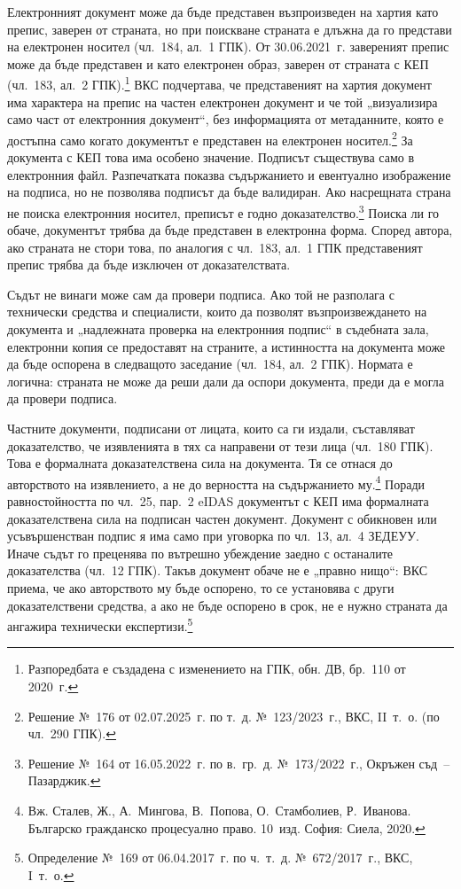 Електронният документ може да бъде представен възпроизведен на хартия като препис, заверен
от страната, но при поискване страната е длъжна да го представи на електронен носител
(чл.~184, ал.~1 ГПК). От 30.06.2021~г. завереният препис може да бъде представен и като
електронен образ, заверен от страната с КЕП (чл.~183, ал.~2 ГПК).\footnote{Разпоредбата е
създадена с изменението на ГПК, обн. ДВ, бр.~110 от 2020~г.} ВКС подчертава, че
представеният на хартия документ има характера на препис на частен електронен документ и
че той „визуализира само част от електронния документ“, без информацията от метаданните,
която е достъпна само когато документът е представен на електронен
носител.\footnote{Решение №~176 от 02.07.2025~г. по т.~д. №~123/2023~г., ВКС, II~т.~о.
(по чл.~290 ГПК).} За документа с КЕП това има особено значение. Подписът съществува само
в електронния файл. Разпечатката показва съдържанието и евентуално изображение на
подписа, но не позволява подписът да бъде валидиран. Ако насрещната страна не поиска
електронния носител, преписът е годно доказателство.\footnote{Решение №~164 от
16.05.2022~г. по в.~гр.~д. №~173/2022~г., Окръжен съд~-- Пазарджик.} Поиска ли го обаче,
документът трябва да бъде представен в електронна форма. Според автора, ако страната не
стори това, по аналогия с чл.~183, ал.~1 ГПК представеният препис трябва да бъде изключен
от доказателствата.

Съдът не винаги може сам да провери подписа. Ако той не разполага с технически средства и
специалисти, които да позволят възпроизвеждането на документа и „надлежната проверка на
електронния подпис“ в съдебната зала, електронни копия се предоставят на страните, а
истинността на документа може да бъде оспорена в следващото заседание (чл.~184, ал.~2
ГПК). Нормата е логична: страната не може да реши дали да оспори документа, преди да е
могла да провери подписа.

Частните документи, подписани от лицата, които са ги издали, съставляват доказателство, че
изявленията в тях са направени от тези лица (чл.~180 ГПК). Това е формалната
доказателствена сила на документа. Тя се отнася до авторството на изявлението, а не до
верността на съдържанието му.\footnote{Вж. Сталев, Ж., А.~Мингова, В.~Попова,
О.~Стамболиев, Р.~Иванова. Българско гражданско процесуално право. 10~изд. София: Сиела,
2020.} Поради равностойността по чл.~25, пар.~2 eIDAS документът с КЕП има формалната
доказателствена сила на подписан частен документ. Документ с обикновен или усъвършенстван
подпис я има само при уговорка по чл.~13, ал.~4 ЗЕДЕУУ. Иначе съдът го преценява по
вътрешно убеждение заедно с останалите доказателства (чл.~12 ГПК). Такъв документ обаче
не е „правно нищо“: ВКС приема, че ако авторството му бъде оспорено, то се установява с
други доказателствени средства, а ако не бъде оспорено в срок, не е нужно страната да
ангажира технически експертизи.\footnote{Определение №~169 от 06.04.2017~г. по ч.~т.~д.
№~672/2017~г., ВКС, I~т.~о.}

